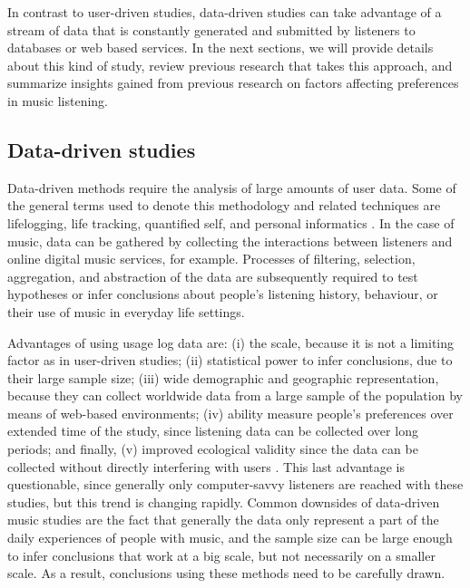 In contrast to user-driven studies, data-driven studies can take advantage of a stream of data that is constantly generated and submitted by listeners to databases or web based services. 
In the next sections, we will provide details about this kind of study, review previous research that takes this approach, and summarize insights gained from previous research on factors affecting preferences in music listening.


\subsection{Data-driven studies} \label{sub:data-driven studies}
Data-driven methods require the analysis of large amounts of user data.
Some of the general terms used to denote this methodology and related techniques are lifelogging, life tracking, quantified self, and personal informatics \autocite{baur11thesis}. 
In the case of music, data can be gathered by collecting the interactions between listeners and online digital music services, for example.
Processes of filtering, selection, aggregation, and abstraction of the data are subsequently required to test hypotheses or infer conclusions about people's listening history, behaviour, or their use of music in everyday life settings. 


Advantages of using usage log data are: 
(i) the scale, because it is not a limiting factor as in user-driven studies; 
(ii) statistical power to infer conclusions, due to their large sample size; 
(iii) wide demographic and geographic representation, because they can collect worldwide data from a large sample of the population by means of web-based environments; 
(iv) ability measure people's preferences over extended time of the study, since listening data can be collected over long periods; and finally, 
(v) improved ecological validity since the data can be collected without directly interfering with users \autocite{rijke12logfileanalysis}. 
This last advantage is questionable, since generally only computer-savvy listeners are reached with these studies, but this trend is changing rapidly. Common downsides of data-driven music studies are the fact that generally  the data only represent a part of the daily experiences of people with music, and the sample size can be large enough to infer conclusions that work at a big scale, but not necessarily on a smaller scale. As a result, conclusions using these methods need to be carefully drawn. 



